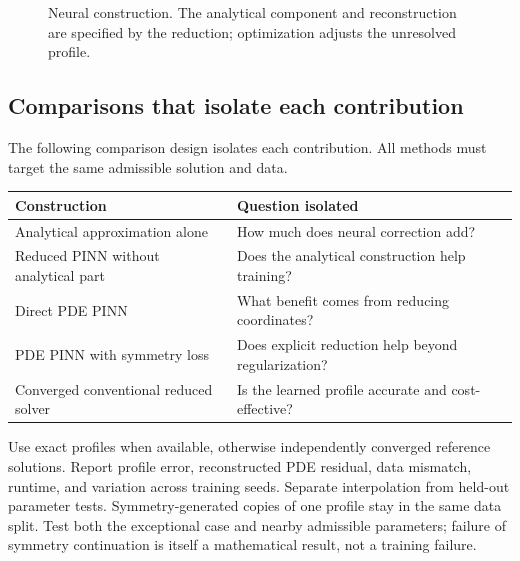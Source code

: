 \documentclass[11pt]{article}
\begin{document}
\begin{figure}[htbp]
\centering
{}
\caption{Neural construction. The analytical component and reconstruction
are specified by the reduction; optimization adjusts the unresolved profile.}
\end{figure}

\subsection{Comparisons that isolate each contribution}
The following comparison design isolates each contribution. All methods must
target the same admissible solution and data.
\begin{center}
\small
\begin{tabularx}{\linewidth}{@{}lX@{}}
\toprule
Construction & Question isolated \\
\midrule
Analytical approximation alone & How much does neural correction add? \\
Reduced PINN without analytical part & Does the analytical construction help training? \\
Direct PDE PINN & What benefit comes from reducing coordinates? \\
PDE PINN with symmetry loss \cite{sympinn} & Does explicit reduction help beyond regularization? \\
Converged conventional reduced solver & Is the learned profile accurate and cost-effective? \\
\bottomrule
\end{tabularx}
\end{center}
Use exact profiles when available, otherwise independently converged
reference solutions. Report profile error, reconstructed PDE residual,
data mismatch, runtime, and variation across training seeds. Separate
interpolation from held-out parameter tests. Symmetry-generated copies
of one profile stay in the same data split. Test both the exceptional case
and nearby admissible parameters; failure of symmetry continuation is itself
a mathematical result, not a training failure.
\end{document}

